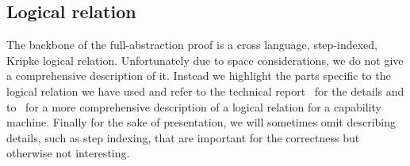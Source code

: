 \documentclass[acmsmall,review,anonymous]{acmart}\settopmatter{printfolios=true,printccs=false,printacmref=false}
\begin{document}
\subsection{Logical relation}
\label{subsec:logical-relation}
The backbone of the full-abstraction proof is a cross language, step-indexed, Kripke logical relation.
Unfortunately due to space considerations, we do not give a comprehensive description of it.
Instead we highlight the parts specific to the logical relation we have used and refer to the technical report~\citep{technical_report} for the details and to~\citet{skorstengaard_reasoning_2017} for a more comprehensive description of a logical relation for a capability machine.
Finally for the sake of presentation, we will sometimes omit describing details, such as step indexing, that are important for the correctness but otherwise not interesting.
\end{document}
